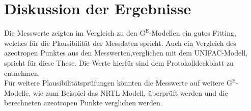 \section{Diskussion der Ergebnisse}
\label{sec:diskussion}

Die Messwerte zeigten im Vergleich zu den $\text{G}^\text{E}$-Modellen ein gutes Fitting, welches für die Plausibilität der Messdaten spricht. Auch ein Vergleich des azeotropen Punktes aus den Messwerten,verglichen mit dem \textsc{UNIFAC}-Modell, spricht für diese These. Die Werte hierfür sind dem Protokolldeckblatt zu entnehmen.\\
Für weitere Plausibilitätsprüfungen könnten die Messwerte auf weitere $\text{G}^\text{E}$-Modelle, wie zum Beispiel das \textsc{NRTL}-Modell, überprüft werden und die berechneten azeotropen Punkte verglichen werden.